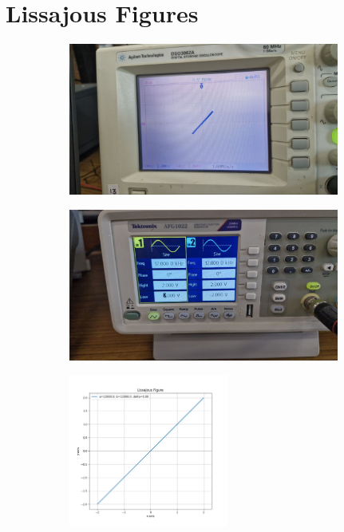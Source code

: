 \documentclass[a4paper,12pt]{article}
\begin{document}
\section*{\color{myblue}Lissajous Figures}
\begin{figure}[H]
    \centering
    \begin{subfigure}{\textwidth}
        \centering
        \includegraphics[height=5cm]{figures/1/plot.jpg}
    \end{subfigure}%
    \begin{subfigure}{\textwidth}
        \centering
        \includegraphics[height=5cm]{figures/1/para.jpg}
    \end{subfigure}
    \begin{subfigure}{\textwidth}
        \centering
        \includegraphics[height=5cm]{figures/1/Figure_1.png}
    \end{subfigure}%
\end{figure}
\end{document}
